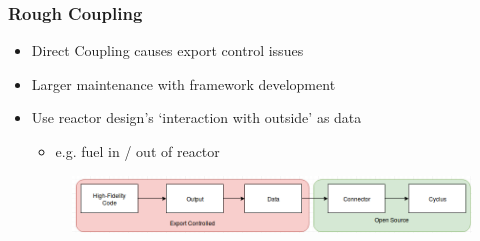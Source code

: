 \begin{frame}
    \frametitle{Rough Coupling}
    \begin{itemize}
        \item Direct Coupling causes export control issues
        \item Larger maintenance with framework development
        \item Use reactor design's `interaction with outside' as data
        \begin{itemize}
            \item e.g. fuel in / out of reactor
        \end{itemize}
        \begin{figure}[htbp!]
        \begin{center}
        \centering
                \includegraphics[width=\textwidth]{./images/con.png}
        \end{center}
    \end{figure}
    \end{itemize}
\end{frame}
